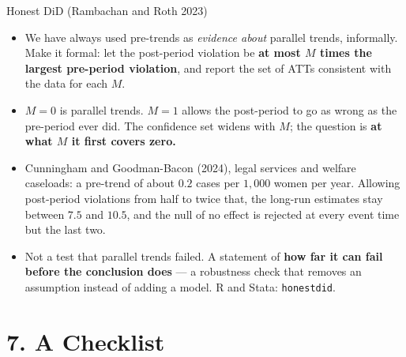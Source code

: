 \documentclass[
  11pt,
  ignorenonframetext,
  aspectratio=169,
]{beamer}
\providecommand{\tightlist}{%
  \setlength{\itemsep}{0pt}\setlength{\parskip}{0pt}}
\begin{document}
\begin{frame}[fragile]{Honest DiD (Rambachan and Roth 2023)}
\protect{}\label{honest-did-rambachan-and-roth-2023}
\begin{itemize}
\tightlist
\item
  We have always used pre-trends as \emph{evidence about} parallel
  trends, informally. Make it formal: let the post-period violation be
  \textbf{at most \(M\) times the largest pre-period violation}, and
  report the set of ATTs consistent with the data for each \(M\).
\item
  \(M = 0\) is parallel trends. \(M = 1\) allows the post-period to go
  as wrong as the pre-period ever did. The confidence set widens with
  \(M\); the question is \textbf{at what \(M\) it first covers zero.}
\item
  Cunningham and Goodman-Bacon (2024), legal services and welfare
  caseloads: a pre-trend of about \(0.2\) cases per \(1{,}000\) women
  per year. Allowing post-period violations from half to twice that, the
  long-run estimates stay between \(7.5\) and \(10.5\), and the null of
  no effect is rejected at every event time but the last two.
\end{itemize}

\vspace{0.3em}

\begin{itemize}
\tightlist
\item
  Not a test that parallel trends failed. A statement of \textbf{how far
  it can fail before the conclusion does} --- a robustness check that
  removes an assumption instead of adding a model. R and Stata:
  \texttt{honestdid}.
\end{itemize}
\end{frame}

\section{7. A Checklist}\label{a-checklist}
\end{document}
